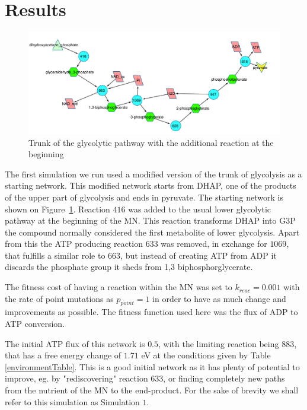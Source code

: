 \documentclass[a4paper,12pt]{article}
\begin{document}
\section{Results}
\label{sec:results}

\begin{figure}[htpb]
	\centering
	\includegraphics[width=1\linewidth]{trunk_glyc_init_large.pdf}
	\caption{Trunk of the glycolytic pathway with the additional reaction at the beginning}
	\label{fig:truncglycinit}
\end{figure}

The first simulation we run used a modified version of the trunk of glycolysis as a starting network. This modified network starts from DHAP, one of the products of the upper part of glycolysis and ends in pyruvate. The starting network is shown on Figure~\ref{fig:truncglycinit}. Reaction $416$ was added to the usual lower glycolytic pathway at the beginning of the MN. This reaction transforms DHAP into G3P the compound normally considered the first metabolite of lower glycolysis. Apart from this the ATP producing reaction $633$ was removed, in exchange for $1069$, that fulfills a similar role to $663$, but instead of creating ATP from ADP it discards the phosphate group it sheds from 1,3 biphosphorglycerate.

The fitness cost of having a reaction within the MN was set to $k_{reac}=0.001$ with the rate of point mutations as $p_{point}=1$ in order to have as much change and improvements as possible. The fitness function used here was the flux of ADP to ATP conversion.

The initial ATP flux of this network is $0.5$, with the limiting reaction being $883$, that has a free energy change of $1.71$ eV at the conditions given by Table \ref{environmentTable}. This is a good initial network as it has plenty of potential to improve, eg. by "rediscovering" reaction $633$, or finding completely new paths from the nutrient of the MN to the end-product. For the sake of brevity we shall refer to this simulation as Simulation $1$.
\end{document}
